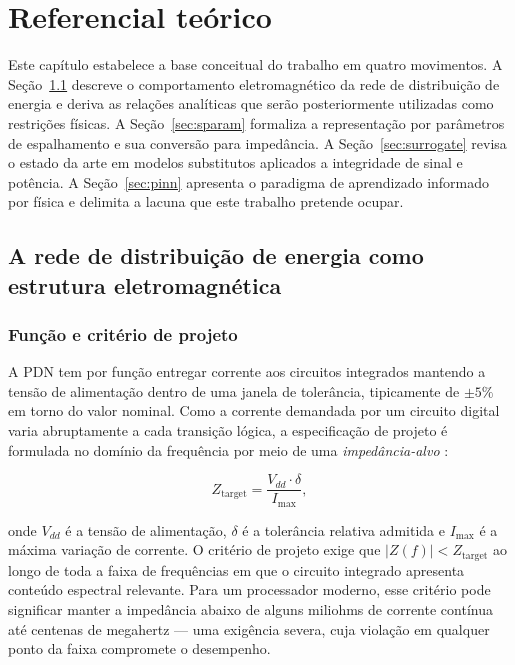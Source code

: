 \chapter{Referencial teórico}
\label{cap:fundamentacao}

Este capítulo estabelece a base conceitual do trabalho em quatro movimentos. A
Seção~\ref{sec:pdn} descreve o comportamento eletromagnético da rede de
distribuição de energia e deriva as relações analíticas que serão posteriormente
utilizadas como restrições físicas. A Seção~\ref{sec:sparam} formaliza a
representação por parâmetros de espalhamento e sua conversão para impedância. A
Seção~\ref{sec:surrogate} revisa o estado da arte em modelos substitutos
aplicados a integridade de sinal e potência. A Seção~\ref{sec:pinn} apresenta o
paradigma de aprendizado informado por física e delimita a lacuna que este
trabalho pretende ocupar.

\section{A rede de distribuição de energia como estrutura eletromagnética}
\label{sec:pdn}

\subsection{Função e critério de projeto}

A PDN tem por função entregar corrente aos circuitos integrados mantendo a tensão
de alimentação dentro de uma janela de tolerância, tipicamente de $\pm 5\%$ em
torno do valor nominal. Como a corrente demandada por um circuito digital varia
abruptamente a cada transição lógica, a especificação de projeto é formulada no
domínio da frequência por meio de uma \emph{impedância-alvo}
\citep{swaminathan2020}:

\begin{equation}
Z_{\text{target}} = \frac{V_{dd} \cdot \delta}{I_{\max}},
\label{eq:ztarget}
\end{equation}

\noindent onde $V_{dd}$ é a tensão de alimentação, $\delta$ é a tolerância
relativa admitida e $I_{\max}$ é a máxima variação de corrente. O critério de
projeto exige que $|Z(f)| < Z_{\text{target}}$ ao longo de toda a faixa de
frequências em que o circuito integrado apresenta conteúdo espectral relevante.
Para um processador moderno, esse critério pode significar manter a impedância
abaixo de alguns miliohms de corrente contínua até centenas de megahertz — uma
exigência severa, cuja violação em qualquer ponto da faixa compromete o
desempenho.

